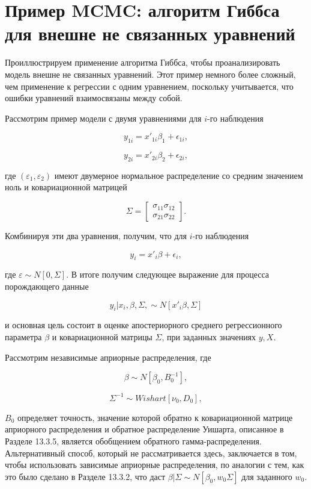 \section{Пример MCMC: алгоритм Гиббса для внешне не связанных уравнений}

Проиллюстрируем применение алгоритма Гиббса, чтобы проанализировать модель внешне не связанных уравнений. Этот пример  немного более сложный, чем применение к регрессии с одним уравнением, поскольку учитывается, что ошибки уравнений взаимосвязаны между собой.

Рассмотрим пример модели с двумя уравнениями для $i$-го наблюдения

\[
y_{1i}=x'_{1i}\beta_1+\epsilon_{1i},
\]

\[
y_{2i}=x'_{2i}\beta_2+\epsilon_{2i},
\]

где $(\varepsilon_1,\varepsilon_2)$ имеют двумерное нормальное распределение со средним значением ноль и ковариационной матрицей 

\[
\Sigma=
\begin{bmatrix} \sigma_{11} \sigma_{12}\\ \sigma_{21} \sigma_{22} \end{bmatrix}.
\]

Комбинируя эти два уравнения, получим, что для $i$-го наблюдения 

\[
y_{i}=x'_{i}\beta+\epsilon_{i},
\]

где $\varepsilon{\sim}N[0,\Sigma]$. В итоге получим следующее выражение для процесса порождающего данные

\[
y_{i}|x_{i},\beta,\Sigma,\sim N[x'_{i}\beta,\Sigma]
\]

и основная цель состоит в  оценке апостериорного среднего регрессионного параметра $\beta$ и ковариационной матрицы $\Sigma$, при заданных значениях $y,X$.

Рассмотрим независимые априорные распределения, где

\[
\beta \sim N[\beta_{0},B^{-1}_0],
\]

\[
\Sigma^{-1} \sim Wishart[\nu_{0},D_0],
\]

$B_0$ определяет точность, значение которой обратно к ковариационной матрице априорного распределения и обратное распределение Уишарта, описанное в Разделе 13.3.5, является обобщением обратного гамма-распределения. Альтернативный способ, который не рассматривается здесь, заключается в том, чтобы использовать зависимые априорные распределения, по аналогии с тем, как это было сделано в Разделе 13.3.2, что даст $\beta|\Sigma  \sim N[\beta_0,w_{0}\Sigma]$ для заданного $w_0$.


